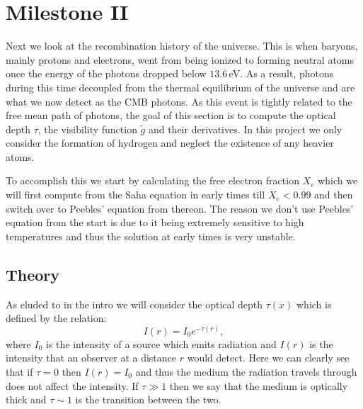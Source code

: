 \documentclass[%
reprint,
 amsmath,amssymb,
 aps,
]{revtex4-2}
\begin{document}
\section{Milestone II}
Next we look at the recombination history of the universe. This is when baryons, mainly protons and electrons, went from being ionized to forming neutral atoms once the energy of the photons dropped below $13.6\,$eV. As a result, photons during this time decoupled from the thermal equilibrium of the universe and are what we now detect as the CMB photons. As this event is tightly related to the free mean path of photons, the goal of this section is to compute the optical depth $\tau$, the visibility function $\tilde g$ and their derivatives. In this project we only consider the formation of hydrogen and neglect the existence of any heavier atoms.

To accomplish this we start by calculating the free electron fraction $X_e$ which we will first compute from the Saha equation in early times till $X_e<0.99$ and then switch over to Peebles' equation from thereon. The reason we don't use Peebles' equation from the start is due to it being extremely sensitive to high temperatures and thus the solution at early times is very unstable.

\subsection{Theory}
As eluded to in the intro we will consider the optical depth $\tau(x)$ which is defined by the relation:
\begin{equation}
	I(r)=I_0e^{-\tau(r)},\label{eq:intensity}
\end{equation}
where $I_0$ is the intensity of a source which emits radiation and $I(r)$ is the intensity that an observer at a distance $r$ would detect. Here we can clearly see that if $\tau=0$ then $I(r)=I_0$ and thus the medium the radiation travels through does not affect the intensity. If $\tau\gg1$ then we say that the medium is optically thick and $\tau\sim1$ is the transition between the two.
\end{document}
